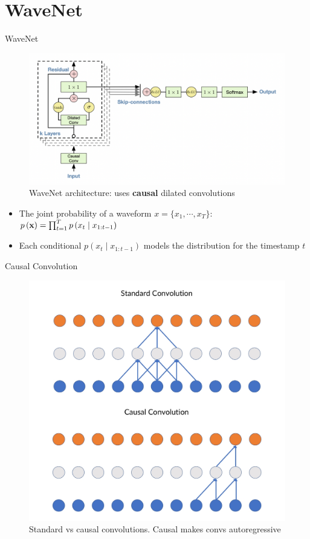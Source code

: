 \section{WaveNet}
\begin{frame}{WaveNet}
    \begin{figure}
    	\centering
    	\includegraphics[width=0.8\linewidth]{figs/wavenet.png}
    	\caption{WaveNet architecture: uses \textbf{causal} dilated convolutions}
    \end{figure}
    \begin{itemize}
        \item The joint probability of a waveform $x = \{x_1, \cdots, x_T \}$:
        $p\left({\bf x}\right)=\prod_{t=1}^{T}p\left(x_{t}\mid x_{1:t-1}\right)$
        \item Each conditional $p\left(x_{t}\mid x_{1:t-1}\right)$ models the distribution for the timestamp $t$
    \end{itemize}
    

\end{frame}
\begin{frame}{Causal Convolution}
    \begin{figure}
    	\centering
    	\includegraphics[width=0.7\linewidth]{figs/causal.png}
    	\caption{Standard vs causal convolutions. Causal makes convs autoregressive}
    \end{figure}
\end{frame}
